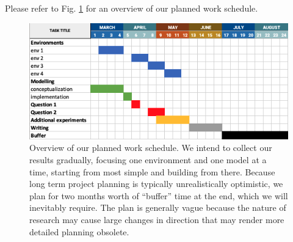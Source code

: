 \documentclass[../main.tex]{subfiles}
\begin{document}
Please refer to Fig. \ref{fig:planning} for an overview of our planned work schedule.

\begin{figure}[h]
\centering
\includegraphics[width=\textwidth]{images/plan}
\caption{Overview of our planned work schedule. We intend to collect our results gradually, focusing
	one environment and one model at a time, starting from most simple and building from there.
	Because long term project planning is typically unrealistically optimistic, we plan for two months
	worth of ``buffer'' time at the end, which we will inevitably require. The plan is generally vague
	because the nature of research may cause large changes in direction that may render more detailed
planning obsolete.}
\label{fig:planning}
\end{figure}


\ifSubfilesClassLoaded{%
	
}{}
\end{document}
